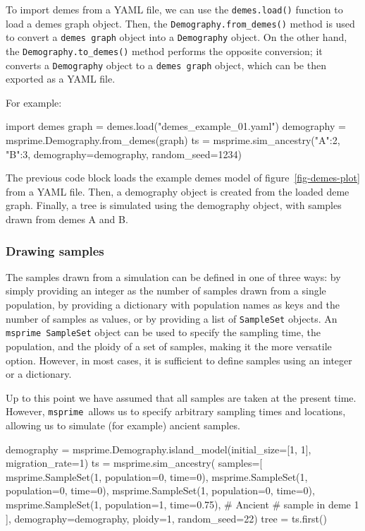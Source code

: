 \documentclass[graybox]{svmult}
\newcommand{\msprime}[0]{\texttt{msprime}}
\begin{document}
To import demes from a YAML file, we can use the \texttt{demes.load()} function to
load a demes graph object. Then, the \texttt{Demography.from\_demes()} method is used to convert a
\texttt{demes graph} object into a \texttt{Demography} object. On the
other hand, the \texttt{Demography.to\_demes()} method performs the opposite conversion; it
converts a \texttt{Demography} object to a \texttt{demes graph} object, which can be then
exported as a YAML file.

For example:

\begin{pythoncode}
import demes
graph = demes.load("demes_example_01.yaml")
demography = msprime.Demography.from_demes(graph)
ts = msprime.sim_ancestry({"A":2, "B":3},
             demography=demography, random_seed=1234)
\end{pythoncode}

The previous code block loads the example demes model of figure~\ref{fig-demes-plot} from a YAML file. Then, a demography
object is created from the loaded deme graph. Finally, a tree is simulated using the demography object, with samples
drawn from demes A and B.


\subsubsection{Drawing samples}\label{ancient-samples}

The samples drawn from a simulation can be defined in one of three ways: by
simply providing an integer as the number of samples drawn from a single population,
by providing a dictionary with population names as keys and the number of
samples as values, or by providing a list of \texttt{SampleSet} objects.
An \msprime\ \texttt{SampleSet} object can be used to specify the sampling
time, the population, and the ploidy of a set of samples, making it the more
versatile option. However, in most cases, it is sufficient to define samples
using an integer or a dictionary.

Up to this point we have assumed that all samples are taken at the
present time. However, \msprime\ allows us to specify arbitrary sampling
times and locations, allowing us to simulate (for example) ancient
samples.

\begin{pythoncode}
demography = msprime.Demography.island_model(initial_size=[1, 1],
                                             migration_rate=1)
ts = msprime.sim_ancestry(
    samples=[
        msprime.SampleSet(1, population=0, time=0),
        msprime.SampleSet(1, population=0, time=0),
        msprime.SampleSet(1, population=0, time=0),
        msprime.SampleSet(1, population=1, time=0.75), # Ancient
        # sample in deme 1
    ],
    demography=demography,
    ploidy=1,
    random_seed=22)
tree = ts.first()
\end{pythoncode}
\end{document}
